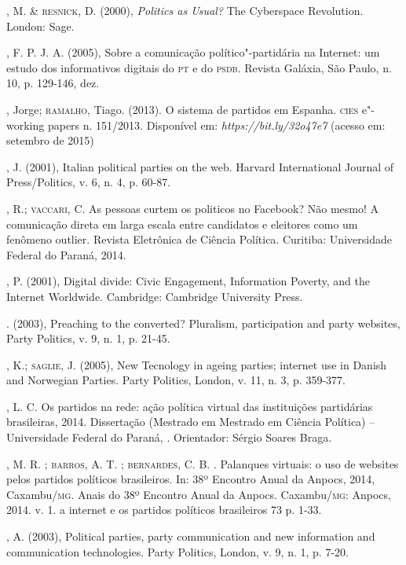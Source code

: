 \begin{bibliohedra}
, M. \& \textsc{resnick}, D. (2000), \emph{Politics as Usual?} The
Cyberspace Revolution. London: Sage.

, F. P. J. A. (2005), Sobre a comunicação político"-partidária na
Internet: um estudo dos informativos digitais do \textsc{pt} e do \textsc{psdb}. Revista
Galáxia, São Paulo, n. 10, p. 129-146, dez.

, Jorge; \textsc{ramalho}, Tiago. (2013). O sistema de partidos em Espanha.
\textsc{cies} e"-working papers n. 151/2013. Disponível em:
\emph{https://bit.ly/32o47e7}
(acesso em: setembro de 2015)

, J. (2001), Italian political parties on the web. Harvard
International Journal of Press/Politics, v. 6, n. 4, p. 60-87.

, R.; \textsc{vaccari}, C. As pessoas curtem os politicos no Facebook? Não
mesmo! A comunicação direta em larga escala entre candidatos e eleitores
como um fenômeno outlier. Revista Eletrônica de Ciência Política.
Curitiba: Universidade Federal do Paraná, 2014.

, P. (2001), Digital divide: Civic Engagement, Information
Poverty, and the Internet Worldwide. Cambridge: Cambridge University
Press.

\titidem. (2003), Preaching to the converted? Pluralism, participation
and party websites, Party Politics, v. 9, n. 1, p. 21-45.

, K.; \textsc{saglie}, J. (2005), New Tecnology in ageing parties;
internet use in Danish and Norwegian Parties. Party Politics, London, v.
11, n. 3, p. 359-377.

, L. C. Os partidos na rede: ação política virtual das instituições
partidárias brasileiras, 2014. Dissertação (Mestrado em Mestrado em
Ciência Política) -- Universidade Federal do Paraná, . Orientador:
Sérgio Soares Braga.

, M. R. ; \textsc{barros}, A. T. ; \textsc{bernardes}, C. B. . Palanques
virtuais: o uso de websites pelos partidos políticos brasileiros. In:
38º Encontro Anual da Anpocs, 2014, Caxambu/\textsc{mg}. Anais do 38º Encontro
Anual da Anpocs. Caxambu/\textsc{mg}: Anpocs, 2014. v. 1. a internet e os
partidos políticos brasileiros 73 p. 1-33.

, A. (2003), Political parties, party communication and new
information and communication technologies. Party Politics, London, v.
9, n. 1, p. 7-20.


\end{bibliohedra}
